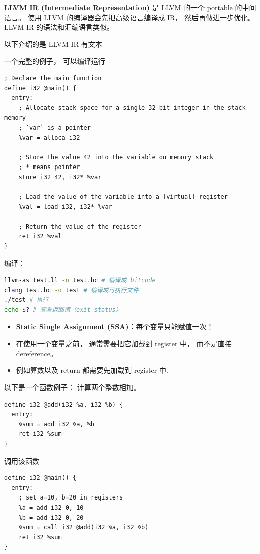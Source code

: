 

\textbf{LLVM IR (Intermediate Representation)} 是 LLVM 的一个 portable 的中间语言。 使用 LLVM 的编译器会先把高级语言编译成 IR， 然后再做进一步优化。 LLVM IR 的语法和汇编语言类似。

以下介绍的是 LLVM IR 有文本

一个完整的例子， 可以编译运行
\begin{lstlisting}[language=none,caption=test.ll]
; Declare the main function
define i32 @main() {
  entry:
    ; Allocate stack space for a single 32-bit integer in the stack memory
    ; `var` is a pointer
    %var = alloca i32

    ; Store the value 42 into the variable on memory stack
    ; * means pointer
    store i32 42, i32* %var

    ; Load the value of the variable into a [virtual] register
    %val = load i32, i32* %var

    ; Return the value of the register
    ret i32 %val
}
\end{lstlisting}

编译：
\begin{lstlisting}[language=bash]
llvm-as test.ll -o test.bc # 编译成 bitcode
clang test.bc -o test # 编译成可执行文件
./test # 执行
echo $? # 查看返回值（exit status）
\end{lstlisting}

\begin{itemize}
\item \textbf{Static Single Assignment (SSA)}：每个变量只能赋值一次！
\item  在使用一个变量之前， 通常需要把它加载到 register 中， 而不是直接 dereference。
\item 例如算数以及 return 都需要先加载到 register 中.
\end{itemize}

以下是一个函数例子： 计算两个整数相加。
\begin{lstlisting}[language=none]
define i32 @add(i32 %a, i32 %b) {
  entry:
    %sum = add i32 %a, %b
    ret i32 %sum
}
\end{lstlisting}

调用该函数
\begin{lstlisting}[language=none]
define i32 @main() {
  entry:
    ; set a=10, b=20 in registers
    %a = add i32 0, 10
    %b = add i32 0, 20
    %sum = call i32 @add(i32 %a, i32 %b)
    ret i32 %sum
}
\end{lstlisting}

